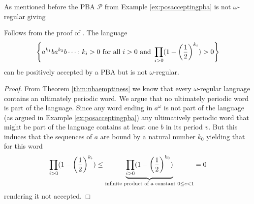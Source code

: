 As mentioned before the \ac{PBA} $\mathcal{P}$ from Example 
\ref{ex:posacceptingpba} is not $\omega$-regular giving
\begin{lemma}
  Follows from the proof of \cite[Theorem 4]{RecOmeLangProbAuto}.
  The language
  \begin{equation*}
    \left\{a^{k_{1}}ba^{k_{2}}b\dots:k_{i}>0\text{ for all }i>0\text{ and }
    \prod_{i>0}(1-\left(\frac{1}{2}\right)^{k_{i}}) > 0\right\}
  \end{equation*}
  can be positively accepted by a \ac{PBA} but is not $\omega$-regular.
  \label{lem:posaccpba>omegareg}
\end{lemma}
\begin{proof}
  From Theorem \ref{thm:nbaemptiness} we know that every $\omega$-regular 
  language contains an ultimately periodic word. We argue that no ultimately 
  periodic word is part of the language. Since any word ending in $a^{\omega}$ 
  is not part of the language (as argued in Example \ref{ex:posacceptingpba}) 
  any ultimatively periodic word that might be part of the language contains at 
  least one $b$ in its period $v$. But this induces that the sequences of $a$ 
  are bound by a natural number $k_{0}$ yielding that for this word
  \begin{equation*}
    \prod_{i>0}(1-\left(\frac{1}{2}\right)^{k_{i}}) \leq
    \underbrace{\prod_{i>0}(1-\left(\frac{1}{2}\right)^{k_{0}})}_{
      \text{infinite product of a constant }0\leq c<1} = 0
  \end{equation*}
  rendering it not accepted.
\end{proof}

